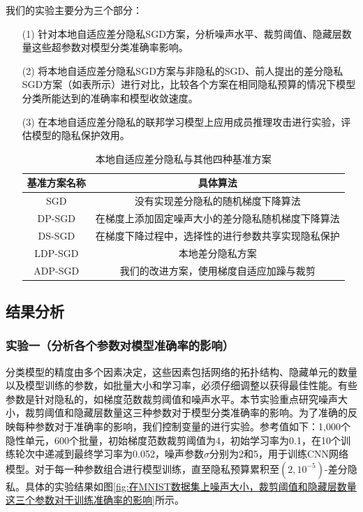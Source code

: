 我们的实验主要分为三个部分：
\begin{enumerate}
\item [(1)] 针对本地自适应差分隐私SGD方案，分析噪声水平、裁剪阈值、隐藏层数量这些超参数对模型分类准确率影响。
\item [(2)] 将本地自适应差分隐私SGD方案与非隐私的SGD、前人提出的差分隐私SGD方案（如表所示）进行对比，比较各个方案在相同隐私预算的情况下模型分类所能达到的准确率和模型收敛速度。
\item [(3)] 在本地自适应差分隐私的联邦学习模型上应用成员推理攻击进行实验，评估模型的隐私保护效用。

\begin{table}[H]
	\centering
	\begin{tabular}{cc}
		\hline
		基准方案名称& 具体算法\\
		\hline
		SGD& 没有实现差分隐私的随机梯度下降算法\\
		DP-SGD\upcite{ref57}& 在梯度上添加固定噪声大小的差分隐私随机梯度下降算法\\
		DS-SGD\upcite{ref67}& 在梯度下降过程中，选择性的进行参数共享实现隐私保护\\
		LDP-SGD& 本地差分隐私方案\\
		ADP-SGD& 我们的改进方案，使用梯度自适应加躁与裁剪\\
		\hline
	\end{tabular}
	\caption{本地自适应差分隐私与其他四种基准方案}
	\label{tab1}
\end{table}

\end{enumerate}

\subsection{结果分析}

\subsubsection{实验一（分析各个参数对模型准确率的影响）} 
分类模型的精度由多个因素决定，这些因素包括网络的拓扑结构、隐藏单元的数量以及模型训练的参数，如批量大小和学习率，必须仔细调整以获得最佳性能。有些参数是针对隐私的，如梯度范数裁剪阈值和噪声水平。本节实验重点研究噪声大小，裁剪阈值和隐藏层数量这三种参数对于模型分类准确率的影响。为了准确的反映每种参数对于准确率的影响，我们控制变量的进行实验。参考值如下：1,000个隐性单元，600个批量，初始梯度范数裁剪阈值为4，初始学习率为0.1，在10个训练轮次中递减到最终学习率为0.052，噪声参数$\sigma$分别为2和5，用于训练CNN网络模型。对于每一种参数组合进行模型训练，直至隐私预算累积至$\left(2,10^{-5}\right)$-差分隐私。具体的实验结果如图\ref{fig:在MNIST数据集上噪声大小，裁剪阈值和隐藏层数量这三个参数对于训练准确率的影响}所示。

